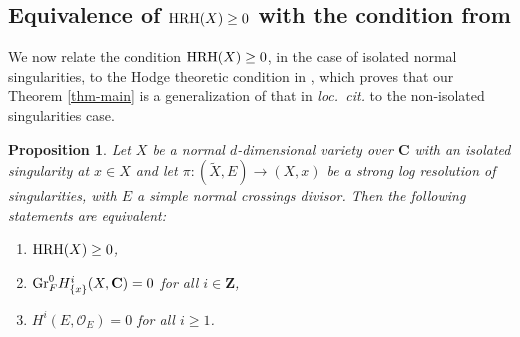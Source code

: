 \documentclass[letterpaper,11pt]{amsart}
\theoremstyle{plain}
\newtheorem{prop}[thm]{Proposition}
\theoremstyle{definition}
\theoremstyle{remark}
\def\Z{{\mathbf Z}}
\def\C{{\mathbf C}}
\def\cO{\mathcal{O}}
\begin{document}
\subsection{Equivalence of ${\rm HRH}(X) \geq 0$ with the condition from \cite{Srinivas-Takagi}}

We now relate the condition ${\rm HRH}(X) \geq 0$, in the case of isolated normal singularities, to the Hodge theoretic condition in \cite{Srinivas-Takagi}, which proves that our Theorem \ref{thm-main} is a generalization of that in \emph{loc.\ cit.} to the non-isolated singularities case.

\begin{prop} Let $X$ be a normal $d$-dimensional variety over $\C$ with an isolated singularity at $x\in X$ and let $\pi \colon (\widetilde{X},E) \to (X,x)$ be a strong log resolution of singularities, with $E$ a simple normal crossings divisor. Then the following statements are equivalent:
\begin{enumerate}
\setlength\itemsep{0.2em}
    \item ${\rm HRH}(X) \geq 0$,
    \item ${\rm Gr}_F^0 H^i_{\{x\}}(X,\C) = 0$ for all $i\in \Z$,
    \item $H^i(E,\cO_E) = 0$ for all $i\geq 1$.
\end{enumerate}
\end{prop}
\end{document}
